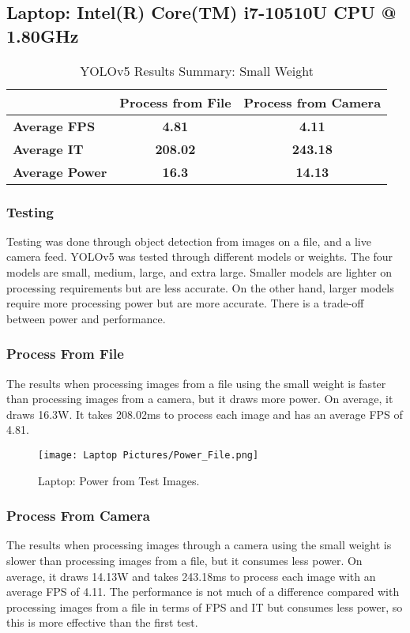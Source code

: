\documentclass[Report]{IEEEtran}
\begin{document}
\subsection{Laptop: Intel(R) Core(TM) i7-10510U CPU @ 1.80GHz}

\begin{table}[htbt]
\centering
\caption{YOLOv5 Results Summary: Small Weight}
\label{}
\begin{tabular}{|l|c|c|}
\hline
\textbf{} & \multicolumn{1}{l|}{\textbf{Process from File}} & \multicolumn{1}{l|}{\textbf{Process from Camera}} \\ \hline
\textbf{Average FPS}   & \textbf{4.81}   & \textbf{4.11}   \\ \hline
\textbf{Average IT}    & \textbf{208.02} & \textbf{243.18} \\ \hline
\textbf{Average Power} & \textbf{16.3}   & \textbf{14.13}  \\ \hline
\end{tabular}
\end{table}

\subsubsection{Testing}
Testing was done through object detection from images on a file, and a live camera feed. YOLOv5 was tested through different models or weights. The four models are small, medium, large, and extra large. Smaller models are lighter on processing requirements but are less accurate. On the other hand, larger models require more processing power but are more accurate. There is a trade-off between power and performance.

\subsubsection{Process From File}
The results when processing images from a file using the small weight is faster than processing images from a camera, but it draws more power. On average, it draws 16.3W. It takes 208.02ms to process each image and has an average FPS of 4.81.

\begin{figure}[]
\centerline{\texttt{[image: Laptop Pictures/Power\_File.png]}}
\caption{Laptop: Power from Test Images.}
\label{fig}
\end{figure}

\subsubsection{Process From Camera}
The results when processing images through a camera using the small weight is slower than processing images from a file, but it consumes less power. On average, it draws 14.13W and takes 243.18ms to process each image with an average FPS of 4.11. The performance is not much of a difference compared with processing images from a file in terms of FPS and IT but consumes less power, so this is more effective than the first test.
\end{document}
